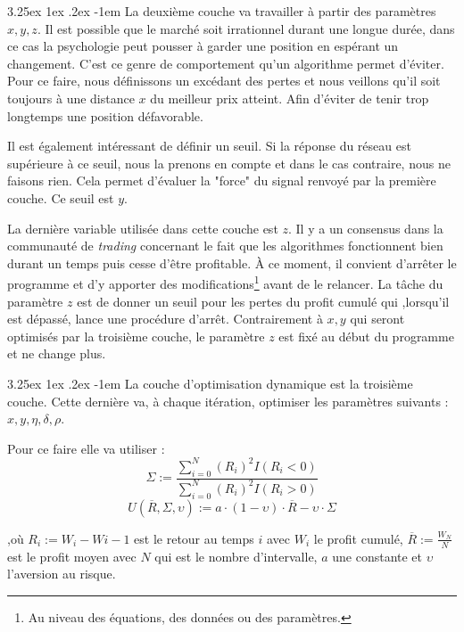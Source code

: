 \documentclass[a4paper, 11pt]{article}
\makeatletter
\renewcommand\paragraph{\@startsection{paragraph}{5}{\z@}%
  {3.25ex \@plus1ex \@minus.2ex}%
  {-1em}%
  {\normalfont\normalsize\bfseries}}
\makeatother
\begin{document}
\paragraph{}
La deuxième couche va travailler à partir des paramètres $x,y,z$. Il est possible que le marché soit irrationnel durant une longue
durée, dans ce cas la psychologie peut pousser à garder une position en espérant un changement. C'est ce genre de comportement qu'un
algorithme permet d'éviter. Pour ce faire, nous définissons un excédant des pertes et nous veillons qu'il soit toujours à une distance
$x$ du meilleur prix atteint. Afin d'éviter de tenir trop longtemps une position défavorable.

Il est également intéressant de définir un seuil. Si la réponse du réseau est supérieure à ce seuil, nous la prenons en compte et
dans le cas contraire, nous ne faisons rien. Cela permet d'évaluer la "force" du signal renvoyé par la première couche. Ce seuil
est $y$.

La dernière variable utilisée dans cette couche est $z$. Il y a un consensus dans la communauté de \textit{trading} concernant le fait
que les algorithmes fonctionnent bien durant un temps puis cesse d'être profitable. À ce moment, il convient d'arrêter le programme
et d'y apporter des modifications\footnote{Au niveau des équations, des données ou des paramètres.} avant de le relancer. La tâche du
paramètre $z$ est de donner un seuil pour les pertes du profit cumulé qui ,lorsqu'il est dépassé, lance une procédure d'arrêt.
Contrairement à $x,y$ qui seront optimisés par la troisième couche, le paramètre $z$ est fixé au début du programme et ne change plus.

\paragraph{}
La couche d'optimisation dynamique est la troisième couche. Cette dernière va, à chaque itération, optimiser les paramètres suivants :
$x,y,\eta,\delta,\rho$.

Pour ce faire elle va utiliser \cite{fx_trading}:
$$\Sigma := \frac{\sum_{i=0}^N (R_i)^2 I(R_i < 0)}{\sum_{i=0}^N (R_i)^2 I(R_i > 0)}$$
$$ U(\overline{R},\Sigma,\upsilon) := a\cdot(1-\upsilon)\cdot \overline{R} - \upsilon \cdot \Sigma$$

,où $R_i := W_i - W{i-1}$ est le retour au temps $i$ avec $W_i$ le profit cumulé, $\overline{R} := \frac{W_N}{N}$ est le profit moyen
avec $N$ qui est le nombre d'intervalle, $a$ une constante et $\upsilon$ l'aversion au risque.
\end{document}
